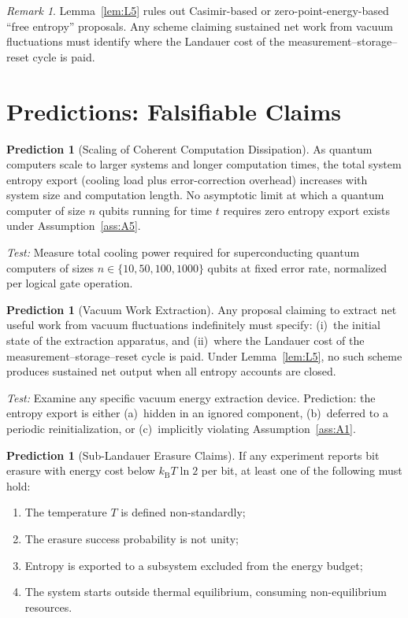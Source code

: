 \documentclass[12pt,letterpaper]{article}
\theoremstyle{plain}
\theoremstyle{definition}
\newtheorem{prediction}[theorem]{Prediction}
\theoremstyle{remark}
\newtheorem{remark}[theorem]{Remark}
\newcommand{\kB}{k_{\mathrm{B}}}
\newcommand{\lnTwo}{\ln 2}
\begin{document}
\begin{remark}
Lemma~\ref{lem:L5} rules out Casimir-based or zero-point-energy-based ``free entropy''
proposals.  Any scheme claiming sustained net work from vacuum fluctuations must identify where
the Landauer cost of the measurement--storage--reset cycle is paid.
\end{remark}

\section{Predictions: Falsifiable Claims}
\label{sec:predictions}

\begin{prediction}[Scaling of Coherent Computation Dissipation]\label{pred:P1}
As quantum computers scale to larger systems and longer computation times, the total system
entropy export (cooling load plus error-correction overhead) increases with system size and
computation length.  No asymptotic limit at which a quantum computer of size $n$ qubits
running for time $t$ requires zero entropy export exists under Assumption~\ref{ass:A5}.

\medskip\noindent
\textit{Test:} Measure total cooling power required for superconducting quantum computers of
sizes $n \in \{10, 50, 100, 1000\}$ qubits at fixed error rate, normalized per logical gate
operation.
\end{prediction}

\begin{prediction}[Vacuum Work Extraction]\label{pred:P2}
Any proposal claiming to extract net useful work from vacuum fluctuations indefinitely must
specify: (i)~the initial state of the extraction apparatus, and (ii)~where the Landauer cost
of the measurement--storage--reset cycle is paid.  Under Lemma~\ref{lem:L5}, no such scheme
produces sustained net output when all entropy accounts are closed.

\medskip\noindent
\textit{Test:} Examine any specific vacuum energy extraction device.  Prediction: the entropy
export is either (a)~hidden in an ignored component, (b)~deferred to a periodic
reinitialization, or (c)~implicitly violating Assumption~\ref{ass:A1}.
\end{prediction}

\begin{prediction}[Sub-Landauer Erasure Claims]\label{pred:P3}
If any experiment reports bit erasure with energy cost below $\kB T\lnTwo$ per bit, at least
one of the following must hold:
\begin{enumerate}[label=(\roman*)]
  \item The temperature $T$ is defined non-standardly;
  \item The erasure success probability is not unity;
  \item Entropy is exported to a subsystem excluded from the energy budget;
  \item The system starts outside thermal equilibrium, consuming non-equilibrium resources.
\end{enumerate}
\end{prediction}
\end{document}
